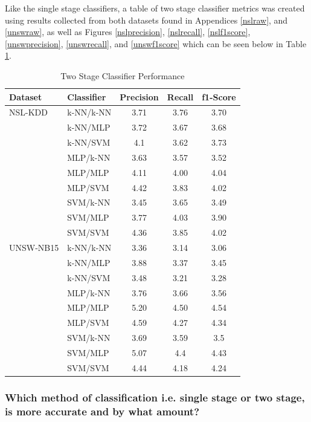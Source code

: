 \documentclass[12pt,a4paper]{article}
\begin{document}
Like the single stage classifiers, a table of two stage classifier metrics was created using results collected from both datasets found in Appendices \ref{nslraw}, and \ref{unswraw}, as well as Figures \ref{nslprecision}, \ref{nslrecall}, \ref{nslf1score}, \ref{unswprecision}, \ref{unswrecall}, and \ref{unswf1score} which can be seen below in Table \ref{twostagemetric}.

\begin{table}[H]
\centering
\caption{Two Stage Classifier Performance}
\label{twostagemetric}
\begin{tabular}{@{}llccc@{}}
\toprule
Dataset & Classifier & Precision & Recall & f1-Score \\ \midrule
NSL-KDD   & k-NN/k-NN & 3.71     & 3.76  & 3.70    \\
	  & k-NN/MLP & 3.72 & 3.67 & 3.68 \\
	  & k-NN/SVM & 4.1 & 3.62  & 3.73 \\
	  & MLP/k-NN & 3.63 & 3.57 & 3.52 \\
          & MLP/MLP   & 4.11     & 4.00  & 4.04    \\
	  & MLP/SVM & 4.42 & 3.83 & 4.02 \\
	  & SVM/k-NN & 3.45 & 3.65 & 3.49 \\
	  & SVM/MLP & 3.77 & 4.03 & 3.90 \\
	  & SVM/SVM   & 4.36     & 3.85  & 4.02    \\
UNSW-NB15 & k-NN/k-NN & 3.36     & 3.14  & 3.06    \\
	  & k-NN/MLP & 3.88 & 3.37 & 3.45 \\
	  & k-NN/SVM & 3.48 & 3.21 & 3.28 \\
	  & MLP/k-NN & 3.76 & 3.66 & 3.56 \\
          & MLP/MLP   & 5.20     & 4.50  & 4.54    \\ 
	  & MLP/SVM & 4.59 & 4.27 & 4.34 \\
	  & SVM/k-NN & 3.69 & 3.59 & 3.5 \\
	  & SVM/MLP & 5.07 & 4.4 & 4.43 \\
	  & SVM/SVM   & 4.44     & 4.18  & 4.24    \\ \bottomrule
\end{tabular}
\end{table}

\subsubsection*{Which method of classification i.e. single stage or two stage, is more accurate and by what amount?}
\end{document}
